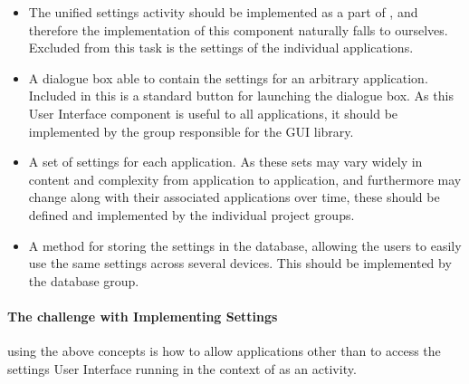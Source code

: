 \begin{itemize}
	\item The unified settings activity should be implemented as a part of \launcher, and therefore the implementation of this component naturally falls to ourselves. 
	Excluded from this task is the settings of the individual applications.
	\item A dialogue box able to contain the settings for an arbitrary \giraf application. Included in this is a standard button for launching the dialogue box. 
	As this User Interface component is useful to all applications, it should be implemented by the group responsible for the \giraf GUI library.
	\item A set of settings for each \giraf application.
	As these sets may vary widely in content and complexity from application to application, and furthermore may change along with their associated applications over time, these should be defined and implemented by the individual project groups. 
	\item A method for storing the settings in the database, allowing the users to easily use the same settings across several devices. 
	This should be implemented by the database group. 
\end{itemize}


\paragraph{The challenge with Implementing Settings} using the above concepts is how to allow applications other than \launcher to access the settings User Interface running in the context of \launcher as an activity.

